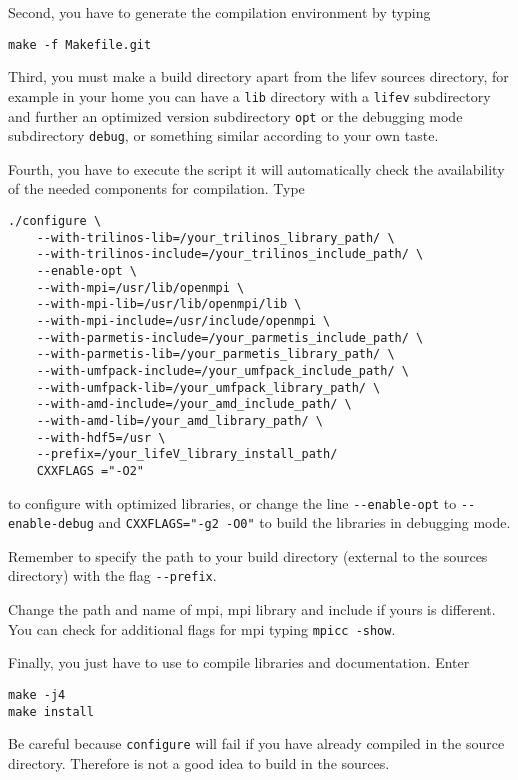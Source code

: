 \noindent Second, you have to generate the compilation environment by typing
\begin{verbatim}
make -f Makefile.git
\end{verbatim}

\noindent Third, you must make a build directory apart from the 
lifev sources directory, for example in your home you can have a 
\verb!lib! directory with a \verb!lifev! subdirectory and further 
an optimized version subdirectory \verb!opt! or the debugging mode 
subdirectory \verb!debug!, or something similar according to your own taste. 


\noindent Fourth, you have to execute the script
it will automatically check the availability of the needed components
for \lifev compilation. Type

\begin{verbatim}
./configure \
    --with-trilinos-lib=/your_trilinos_library_path/ \
    --with-trilinos-include=/your_trilinos_include_path/ \
    --enable-opt \
    --with-mpi=/usr/lib/openmpi \
    --with-mpi-lib=/usr/lib/openmpi/lib \
    --with-mpi-include=/usr/include/openmpi \
    --with-parmetis-include=/your_parmetis_include_path/ \
    --with-parmetis-lib=/your_parmetis_library_path/ \
    --with-umfpack-include=/your_umfpack_include_path/ \
    --with-umfpack-lib=/your_umfpack_library_path/ \
    --with-amd-include=/your_amd_include_path/ \
    --with-amd-lib=/your_amd_library_path/ \
    --with-hdf5=/usr \
    --prefix=/your_lifeV_library_install_path/
    CXXFLAGS ="-O2"
\end{verbatim}

to configure with optimized libraries, or change the line \verb!--enable-opt! to
\verb!--enable-debug! and \verb!CXXFLAGS="-g2 -O0"! to build the libraries 
in debugging mode. 

Remember to specify the 
path to your build directory (external to the sources directory) with the flag \verb!--prefix!. 

Change the path and name of mpi, mpi library and include if yours is different. 
You can check for additional flags for mpi typing \verb!mpicc -show!. 


\noindent Finally, you just have to use  to compile \lifev libraries and documentation.
Enter
\begin{verbatim}
make -j4
make install
\end{verbatim}

\noindent Be careful because \verb!configure! will fail if you have already compiled
\lifev in the source directory. Therefore is not a good idea to build in the sources. 

